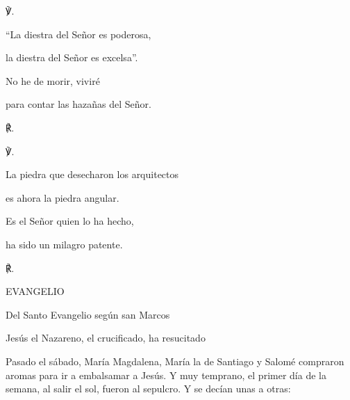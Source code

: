 			\begin{readbody}\begin{readred}℣.\end{readred} “La diestra del Señor es poderosa, \end{readbody}
			
			\begin{readtabbed}la diestra del Señor es excelsa”. \end{readtabbed}
			
			\begin{readtabbed}No he de morir, viviré \end{readtabbed}
			
			\begin{readtabbed}para contar las hazañas del Señor. \begin{readred}℟.\end{readred}\end{readtabbed}
			
			\begin{readbody}\begin{readred}℣.\end{readred} La piedra que desecharon los arquitectos \end{readbody}
			
			\begin{readtabbed}es ahora la piedra angular. \end{readtabbed}
			
			\begin{readtabbed}Es el Señor quien lo ha hecho, \end{readtabbed}
			
			\begin{readtabbed}ha sido un milagro patente. \begin{readred}℟.\end{readred}\end{readtabbed}
			
			\begin{readtitle}EVANGELIO\end{readtitle}
			
			\begin{readbook}Del Santo Evangelio según san Marcos \end{readbook}
			
			\begin{readtheme}Jesús el Nazareno, el crucificado, ha resucitado\end{readtheme}
			
			\begin{readbody}Pasado el sábado, María Magdalena, María la de Santiago y Salomé compraron aromas para ir a embalsamar a Jesús. Y muy temprano, el primer día de la semana, al salir el sol, fueron al sepulcro. Y se decían unas a otras: \end{readbody}
			
